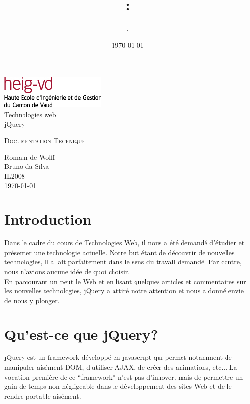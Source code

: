 \documentclass[10pt,a4paper,titlepage]{article}
\author{\auteurOne, \auteurTwo}
\title{\branchetag : \laboname}
\date{\today}
\newcommand{\branche}{Technologies web}
\newcommand{\laboname}{jQuery}
\newcommand{\auteurOne}{Romain de Wolff}
\newcommand{\auteurTwo}{Bruno da Silva}
\newcommand{\promo}{IL2008}
\begin{document}
\pagestyle{headings}
\begin{titlepage}
	\begin{center}
	\includegraphics{img/logo-HEIG-VD.jpg}\\
		\vspace{3cm}
		\LARGE \branche %
		\vspace{3cm}\\
		\Huge \laboname \\
		\vspace{3cm}

		\Large \textsc{Documentation Technique} \\
		\vspace{3cm}

		\large \auteurOne \\
		\auteurTwo \\	
		\vspace{10pt}
		\normalsize \textsc{\promo} \\

		\vspace{2cm}
		\today
	\end{center}
\end{titlepage}

\tableofcontents
\newpage
\pagestyle{fancy}
\section{Introduction}
Dans le cadre du cours de Technologies Web, il nous a été demandé d'étudier et présenter une technologie actuelle. Notre but étant de découvrir de nouvelles technologies, il allait parfaitement dans le sens du travail demandé. Par contre, nous n'avions aucune idée de quoi choisir.\\

En parcourant un peut le Web et en lisant quelques articles et commentaires sur les nouvelles technologies, jQuery a attiré notre attention et nous a donné envie de nous y plonger. 

\section{Qu'est-ce que jQuery?}\label{jQuery}
jQuery est un framework développé en javascript qui permet notamment de manipuler aisément DOM, d'utiliser AJAX, de créer des animations, etc...
La vocation première de ce “framework” n'est pas d'innover, mais de permettre un gain de temps non négligeable dans le développement des sites Web et de le rendre portable aisément.\\
\end{document}
